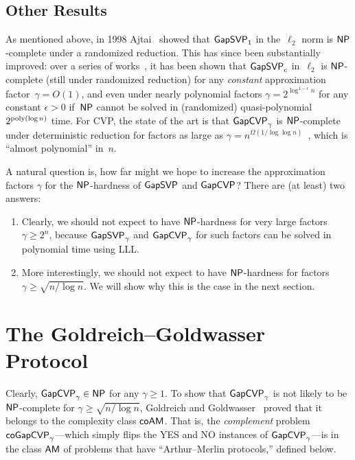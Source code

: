\documentclass[11pt]{article}
\begin{document}
\subsection{Other Results}
\label{sec:other-results}

As mentioned above, in 1998 Ajtai~\cite{DBLP:conf/stoc/Ajtai98} showed
that $\mathsf{GapSVP}_{1}$ in the~$\ell_{2}$ norm is $\mathsf{NP}$-complete under a
randomized reduction. This has since been substantially improved: over
a series of
works~\cite{DBLP:journals/siamcomp/Micciancio00,DBLP:journals/jacm/Khot05,DBLP:conf/stoc/HavivR07},
it has been shown that $\mathsf{GapSVP}_{c}$ in~$\ell_{2}$ is $\mathsf{NP}$-complete
(still under randomized reduction) for any \emph{constant}
approximation factor~$\gamma = O(1)$, and even under nearly polynomial
factors $\gamma = 2^{\log^{1-\epsilon} n}$ for any constant
$\epsilon > 0$ if~$\mathsf{NP}$ cannot be solved in (randomized)
quasi-polynomial $2^{\operatorname{poly}(\log n)}$ time. For CVP, the state of the
art is that $\mathsf{GapCVP}_{\gamma}$ is $\mathsf{NP}$-complete under deterministic
reduction for factors as large as
$\gamma = n^{\Omega(1/{\log\log
    n})}$~\cite{DBLP:journals/jcss/AroraBSS97}, which is ``almost
polynomial'' in~$n$.

A natural question is, how far might we hope to increase the
approximation factors $\gamma$ for the $\mathsf{NP}$-hardness of $\mathsf{GapSVP}$ and
$\mathsf{GapCVP}$? There are (at least) two answers:
\begin{enumerate}
\item Clearly, we should not expect to have $\mathsf{NP}$-hardness for very large
  factors $\gamma \geq 2^n$, because $\mathsf{GapSVP}_{\gamma}$ and
  $\mathsf{GapCVP}_{\gamma}$ for such factors can be solved in polynomial time
  using LLL.
\item More interestingly, we should not expect to have $\mathsf{NP}$-hardness for
  factors $\gamma \geq \sqrt{n/\log n}$. We will show why this is the
  case in the next section.
\end{enumerate}

\section{The Goldreich--Goldwasser Protocol}
\label{sec:gg-protocol}

\newcommand{\cogapcvp}{\cproblem{coGapCVP}}

Clearly, $\mathsf{GapCVP}_\gamma \in \mathsf{NP}$ for any $\gamma \geq 1$. To show
that $\mathsf{GapCVP}_{\gamma}$ is not likely to be $\mathsf{NP}$-complete for
$\gamma \geq \sqrt{n/\log n}$, Goldreich and
Goldwasser~\cite{DBLP:journals/jcss/GoldreichG00} proved that it
belongs to the complexity class $\mathsf{coAM}$. That is, the
\emph{complement} problem $\cogapcvp_{\gamma}$---which simply flips
the YES and NO instances of $\mathsf{GapCVP}_{\gamma}$---is in the class $\mathsf{AM}$
of problems that have ``Arthur--Merlin protocols,'' defined below.
\end{document}
